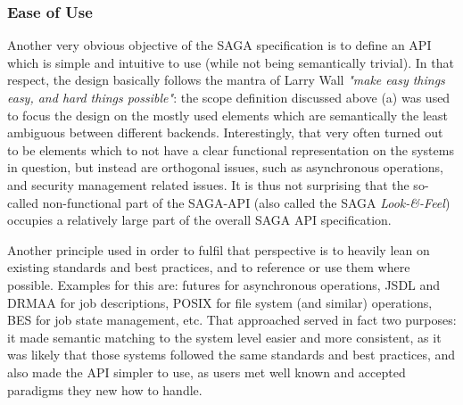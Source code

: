 \documentclass[a4paper,10pt]{article}
\newcommand{\I}[1]{\textit{#1}\xspace}
\begin{document}
   \subsubsection*{Ease of Use}


    Another very obvious objective of the SAGA specification is to
    define an API which is simple and intuitive to use (while not
    being semantically trivial).  In that respect, the design
    basically follows the mantra of Larry Wall \I{"make easy things
    easy, and hard things possible"}: the scope definition discussed
    above (a) was used to focus the design on the mostly used elements
    which are semantically the least ambiguous between different
    backends.  Interestingly, that very often turned out to be
    elements which to not have a clear functional representation on
    the systems in question, but instead are orthogonal issues, such
    as asynchronous operations, and security management related
    issues.  It is thus not surprising that the so-called
    non-functional part of the SAGA-API (also called the SAGA
    \I{Look-\&-Feel}) occupies a relatively large part of the overall
    SAGA API specification.

    Another principle used in order to fulfil that perspective is to
    heavily lean on existing standards and best practices, and to
    reference or use them where possible.  Examples for this are:
    futures for asynchronous operations, JSDL and DRMAA for job
    descriptions, POSIX for file system (and similar) operations, BES
    for job state management, etc.  That approached served in fact two
    purposes: it made semantic matching to the system level easier and
    more consistent, as it was likely that those systems followed the
    same standards and best practices, and also made the API simpler
    to use, as users met well known and accepted paradigms they new
    how to handle.



\end{document}
